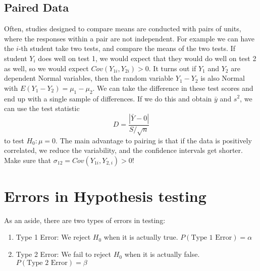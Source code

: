 \documentclass[12pt]{article}
\begin{document}
\subsection{Paired Data}
Often, studies designed to compare means are conducted with pairs of units, where the responses within a pair are not independent. For example we can have the $i$-th student take two tests, and compare the means of the two tests. If student $Y_i$ does well on test 1, we would expect that they would do well on test 2 as well, so we would expect $Cov(Y_{1i}, Y_{2i})>0$. It turns out if $Y_1$ and $Y_2$ are dependent Normal variables, then the random variable $Y_1-Y_2$ is also Normal with $E(Y_1-Y_2)=\mu_1-\mu_2$. We can take the difference in these test scores and end up with a single sample of differences. If we do this and obtain $\bar y$ and $s^2$, we can use the test statistic \[D=\frac{|\bar Y-0|}{S/\sqrt{n}}\] to test $H_0:\mu = 0$. The main advantage to pairing is that if the data is positively correlated, we reduce the variability, and the confidence intervals get shorter. Make sure that $\sigma_{12}=Cov(Y_{1i}, Y_{2,i})>0$!

\section{Errors in Hypothesis testing}
As an aside, there are two types of errors in testing:
\begin{enumerate}
    \item Type 1 Error: We reject $H_0$ when it is actually true. $P(\text{Type 1 Error})=\alpha$
    \item Type 2 Error: We fail to reject $H_0$ when it is actually false. $P(\text{Type 2 Error})=\beta$
\end{enumerate}
\end{document}
